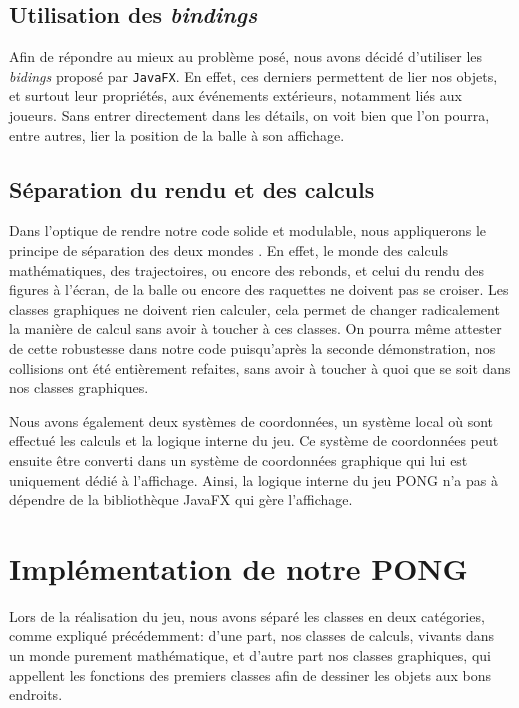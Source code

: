 \documentclass[a4paper,10pt]{article}
\theoremstyle{definition}
\begin{document}
    \subsection{Utilisation des \emph{bindings}}
    Afin de répondre au mieux au problème posé, nous avons décidé d'utiliser les \emph{bidings} proposé par \lstinline{JavaFX}. En effet, ces derniers permettent de lier nos objets, et surtout leur propriétés, aux événements extérieurs, notamment liés aux joueurs. Sans entrer directement dans les détails, on voit bien que l'on pourra, entre autres, lier la position de la balle à son affichage.
    
    \subsection{Séparation du rendu et des calculs}
    Dans l'optique de rendre notre code solide et modulable, nous appliquerons le principe de \og séparation des deux mondes \fg{}. En effet, le monde des calculs mathématiques, des trajectoires, ou encore des rebonds, et celui du rendu des figures à l'écran, de la balle ou encore des raquettes ne doivent pas se croiser. Les classes graphiques ne doivent rien calculer, cela permet de changer radicalement la manière de calcul sans avoir à toucher à ces classes. On pourra même attester de cette robustesse dans notre code puisqu'après la seconde démonstration, nos collisions ont été entièrement refaites, sans avoir à toucher à quoi que se soit dans nos classes graphiques.

    Nous avons également deux systèmes de coordonnées, un système local où sont effectué les calculs et la logique interne du jeu. Ce système de coordonnées peut ensuite être converti dans un système de coordonnées graphique qui lui est uniquement dédié à l'affichage. Ainsi, la logique interne du jeu PONG n'a pas à dépendre de la bibliothèque JavaFX qui gère l'affichage.
    
\section{Implémentation de notre PONG}
%

Lors de la réalisation du jeu, nous avons séparé les classes en deux catégories, comme expliqué précédemment: d'une part, nos classes de calculs, vivants dans un monde purement mathématique, et d'autre part nos classes graphiques, qui appellent les fonctions des premiers classes afin de dessiner les objets aux bons endroits.
\end{document}
